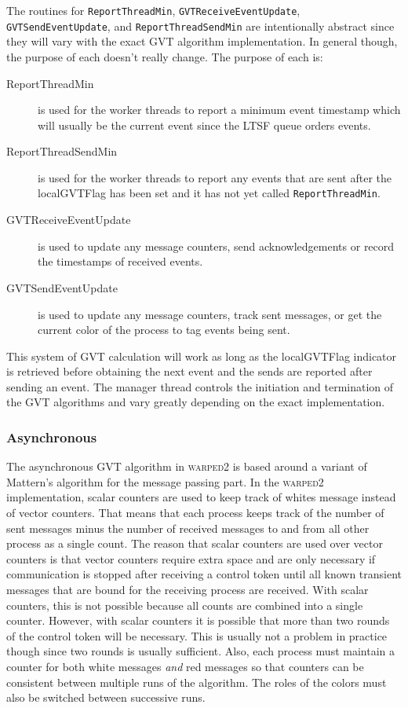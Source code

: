\documentclass[11pt]{book}
\begin{document}
The routines for \texttt{ReportThreadMin}, \texttt{GVTReceiveEventUpdate}, \texttt{GVTSendEventUpdate},
and \texttt{ReportThreadSendMin} are intentionally abstract since they will vary with the exact
GVT algorithm implementation. In general though, the purpose of each doesn't really change. The
purpose of each is:

\begin{description}
    \item[ReportThreadMin ] is used for the worker threads to report a minimum event timestamp
        which will usually be the current event since the LTSF queue orders events.
    \item[ReportThreadSendMin ] is used for the worker threads to report any events that are sent
        after the localGVTFlag has been set and it has not yet called \texttt{ReportThreadMin}.
    \item[GVTReceiveEventUpdate ] is used to update any message counters, send acknowledgements or
        record the timestamps of received events. 
    \item[GVTSendEventUpdate ] is used to update any message counters, track sent messages, or get
        the current color of the process to tag events being sent.
\end{description}

This system of GVT calculation will work as long as the localGVTFlag indicator is retrieved before
obtaining the next event and the sends are reported after sending an event. The manager thread
controls the initiation and termination of the GVT algorithms and vary greatly depending on
the exact implementation.

\subsubsection{Asynchronous}

The asynchronous GVT algorithm in \textsc{warped2} is based around a variant of Mattern's
algorithm for the message passing part. In the \textsc{warped2} implementation, scalar counters
are used to keep track of whites message instead of vector counters. That means that
each process keeps track of the number of sent messages minus the number of received messages
to and from all other process as a single count. The reason that scalar counters are used over
vector counters is that vector counters require extra space and are only necessary if communication
is stopped after receiving a control token until all known transient messages that are bound for
the receiving process are received. With scalar counters, this is not possible because all counts
are combined into a single counter. However, with scalar counters it is possible that more than
two rounds of the control token will be necessary. This is usually not a problem in practice
though since two rounds is usually sufficient. Also, each process must maintain a counter for
both white messages \emph{and} red messages so that counters can be consistent between multiple
runs of the algorithm. The roles of the colors must also be switched between successive runs.
\end{document}
